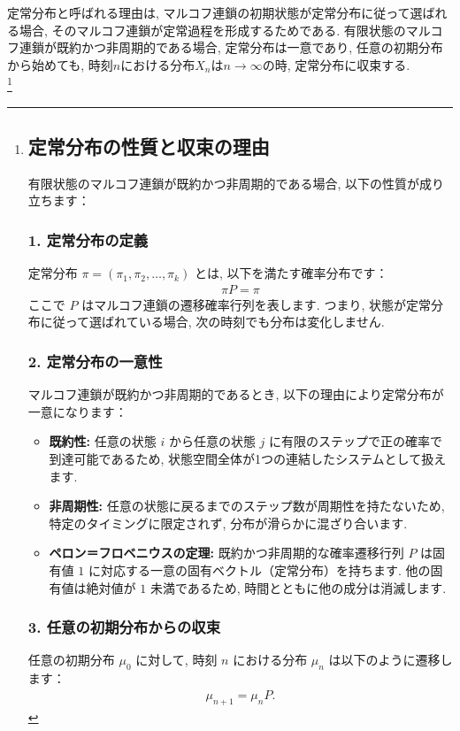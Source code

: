 \documentclass[a4j]{jsarticle}
\begin{document}
定常分布と呼ばれる理由は, マルコフ連鎖の初期状態が定常分布に従って選ばれる場合, そのマルコフ連鎖が定常過程を形成するためである. 有限状態のマルコフ連鎖が既約かつ非周期的である場合, 定常分布は一意であり, 任意の初期分布から始めても, 時刻$n$における分布$X_n$は$n \rightarrow \infty$の時, 定常分布に収束する.\\
\footnote{
	\subsection*{定常分布の性質と収束の理由}

	有限状態のマルコフ連鎖が既約かつ非周期的である場合, 以下の性質が成り立ちます：

	\subsubsection*{1. 定常分布の定義}
	定常分布 $\pi = (\pi_1, \pi_2, \ldots, \pi_k)$ とは, 以下を満たす確率分布です：
	\begin{align*}
		\pi P = \pi
	\end{align*}
	ここで $P$ はマルコフ連鎖の遷移確率行列を表します. つまり, 状態が定常分布に従って選ばれている場合, 次の時刻でも分布は変化しません.

	\subsubsection*{2. 定常分布の一意性}
	マルコフ連鎖が既約かつ非周期的であるとき, 以下の理由により定常分布が一意になります：

	\begin{itemize}
		\item \textbf{既約性:} 任意の状態 $i$ から任意の状態 $j$ に有限のステップで正の確率で到達可能であるため, 状態空間全体が1つの連結したシステムとして扱えます.
		\item \textbf{非周期性:} 任意の状態に戻るまでのステップ数が周期性を持たないため, 特定のタイミングに限定されず, 分布が滑らかに混ざり合います.
		\item \textbf{ペロン＝フロベニウスの定理:} 既約かつ非周期的な確率遷移行列 $P$ は固有値 $1$ に対応する一意の固有ベクトル（定常分布）を持ちます. 他の固有値は絶対値が $1$ 未満であるため, 時間とともに他の成分は消滅します.
	\end{itemize}

	\subsubsection*{3. 任意の初期分布からの収束}
	任意の初期分布 $\mu_0$ に対して, 時刻 $n$ における分布 $\mu_n$ は以下のように遷移します：
	\begin{align*}
		\mu_{n+1} = \mu_n P.
	\end{align*}

}
\end{document}
